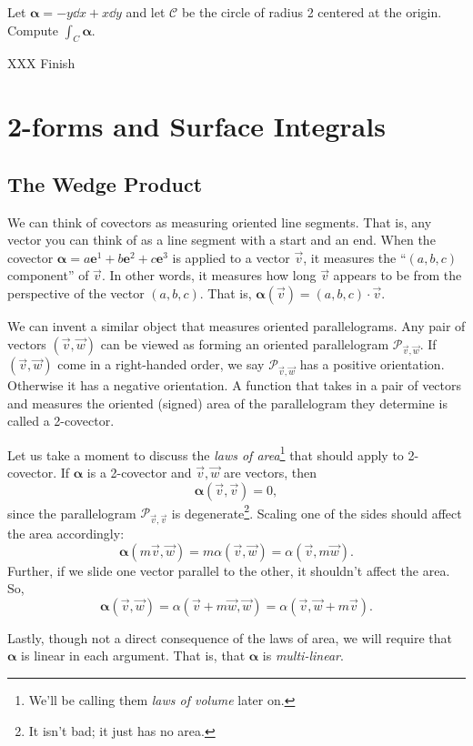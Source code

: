 \begin{example}
	Let $\bm \alpha=-y\dd x+x\dd y$ and let $\mathcal C$ be the circle of
	radius 2 centered at the origin.  Compute $\int_C \bm\alpha$.

	XXX Finish
\end{example}

\section{2-forms and Surface Integrals}

\subsection{The Wedge Product}


We can think of covectors as measuring oriented line segments.  That is,
any vector you can think of as a line segment with a start and an end.
When the covector $\bm\alpha=a\bm e^1+b\bm e^2+c\bm e^3$ is applied to 
a vector $\vec v$, it measures the ``$(a,b,c)$ component'' of $\vec v$.
In other words, it measures how long $\vec v$ appears to be from the perspective
of the vector $(a,b,c)$.  That is, $\bm\alpha(\vec v) = (a,b,c)\cdot \vec v$.

We can invent a similar object that measures oriented parallelograms.
Any pair of vectors $(\vec v,\vec w)$ can be viewed as forming an oriented
parallelogram $\mathcal P_{\vec v,\vec w}$.  If $(\vec v,\vec w)$ come in a
right-handed order, we say $\mathcal P_{\vec v,\vec w}$ has a positive
orientation.  Otherwise it has a negative orientation.
A function
that takes in a pair of vectors and measures the oriented (signed)
area of the parallelogram they determine is called a 2-covector.

Let us take a moment to discuss the \emph{laws of area}\footnote{ We'll be
calling them \emph{laws of volume} later on.} that should
apply to 2-covector.  If $\bm\alpha$ is a 2-covector and $\vec v,\vec w$ are
vectors, then
\[
	\bm\alpha(\vec v,\vec v) = 0,
\]
since the parallelogram $\mathcal P_{\vec v,\vec v}$ is degenerate\footnote{
It isn't bad; it just has no area.}.  Scaling one of the sides should affect
the area accordingly:
\[
	\bm\alpha(m\vec v,\vec w) = m\alpha(\vec v,\vec w) = \alpha(\vec v,m\vec w).
\]
Further, if we slide one vector parallel to the other, it shouldn't affect
the area.  So,
\[
	\bm\alpha(\vec v,\vec w) = \alpha(\vec v+m\vec w,\vec w) = \alpha(\vec v,\vec w+m\vec v).
\]

Lastly, though not a direct consequence of the laws of area,
we will require that $\bm\alpha$ is linear in each argument.
That is, that $\bm\alpha$ is \emph{multi-linear}.

